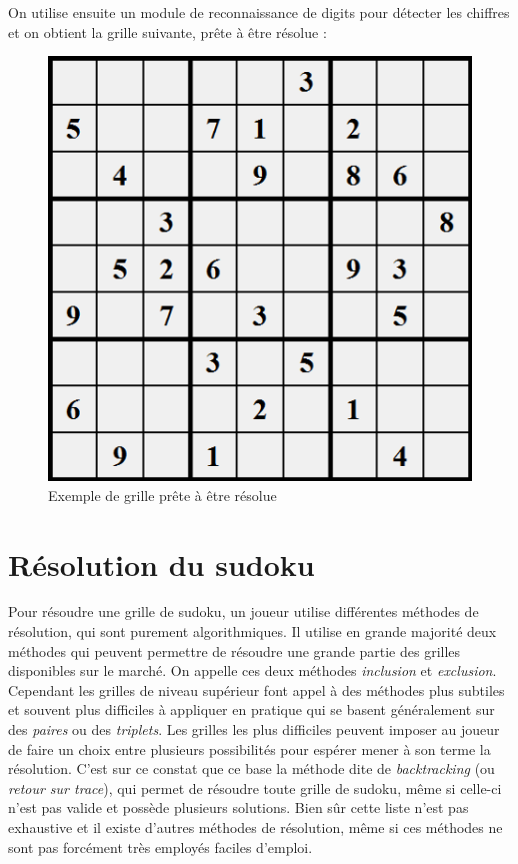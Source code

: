 \documentclass[12pt,a4paper]{report}
\begin{document}
On utilise ensuite un module de reconnaissance de digits pour détecter les chiffres et on obtient la grille suivante, prête à être résolue :

\begin{figure}[!h]
 \center
 \includegraphics[scale=0.55]{../pictures/finished.png}
 \caption{Exemple de grille prête à être résolue}
\end{figure}


\section{Résolution du sudoku}
\label{Resolution}
Pour résoudre une grille de sudoku, un joueur utilise différentes méthodes de résolution, qui sont purement algorithmiques. Il utilise en grande majorité deux méthodes qui peuvent permettre de résoudre une grande partie des grilles disponibles sur le marché. On appelle ces deux méthodes \emph{inclusion} et \emph{exclusion}. Cependant les grilles de niveau supérieur font appel à des méthodes plus subtiles et souvent plus difficiles à appliquer en pratique qui se basent généralement sur des \emph{paires} ou des \emph{triplets}. Les grilles les plus difficiles peuvent imposer au joueur de faire un choix entre plusieurs possibilités pour espérer mener à son terme la résolution. C'est sur ce constat que ce base la méthode dite de \emph{backtracking} (ou \emph{retour sur trace}), qui permet de résoudre toute grille de sudoku, même si celle-ci n'est pas valide et possède plusieurs solutions. Bien sûr cette liste n'est pas exhaustive et il existe d'autres méthodes de résolution, même si ces méthodes ne sont pas forcément très employés faciles d'emploi.
\end{document}
